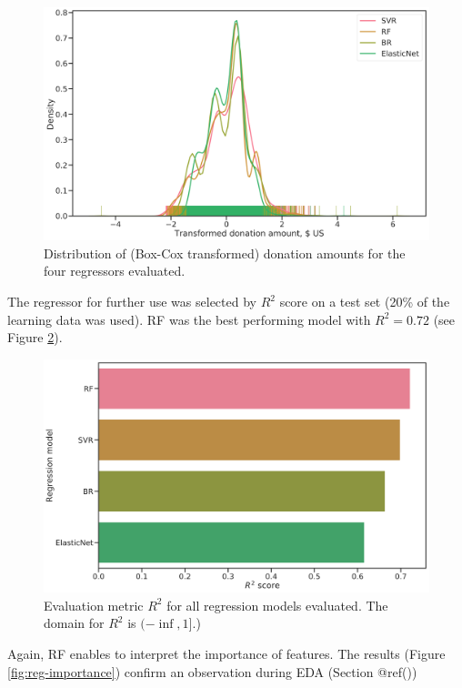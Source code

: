 \documentclass[
  11pt,
  a4paper,
  DIV=12,captions=tableheading,oneside,titlepage]{scrbook}
\begin{document}
\begin{figure}
 
 {\centering \includegraphics[width=0.7\linewidth]{figures/learning/regressor-predictions-comparison} 
 
 }
 
 \caption{Distribution of (Box-Cox transformed) donation amounts for the four regressors evaluated.}\label{fig:reg-distrib}
 \end{figure}

The regressor for further use was selected by \(R^2\) score on a test set (20\% of the learning data was used). RF was the best performing model with \(R^2 = 0.72\) (see Figure \ref{fig:reg-eval}).



\begin{figure}

{\centering \includegraphics[width=0.7\linewidth]{figures/learning/regressor-score-comparison} 

}

\caption{Evaluation metric \(R^2\) for all regression models evaluated. The domain for \(R^2\) is \((-\inf, 1]\).)}\label{fig:reg-eval}
\end{figure}

Again, RF enables to interpret the importance of features. The results (Figure \ref{fig:reg-importance}) confirm an observation during EDA (Section @ref())
\end{document}
